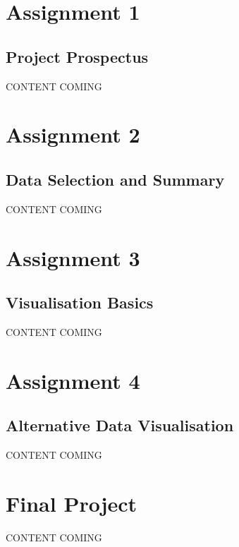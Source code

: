 \documentclass[
  letterpaper,
  DIV=11,
  numbers=noendperiod]{scrreprt}
\begin{document}
\chapter{Assignment 1}\label{assignment-1}

\section{Project Prospectus}\label{project-prospectus}

CONTENT COMING

\chapter{Assignment 2}\label{assignment-2}

\section{Data Selection and Summary}\label{data-selection-and-summary}

CONTENT COMING

\chapter{Assignment 3}\label{assignment-3}

\section{Visualisation Basics}\label{visualisation-basics}

CONTENT COMING

\chapter{Assignment 4}\label{assignment-4}

\section{Alternative Data
Visualisation}\label{alternative-data-visualisation}

CONTENT COMING

\chapter{Final Project}\label{final-project}

CONTENT COMING
\end{document}
